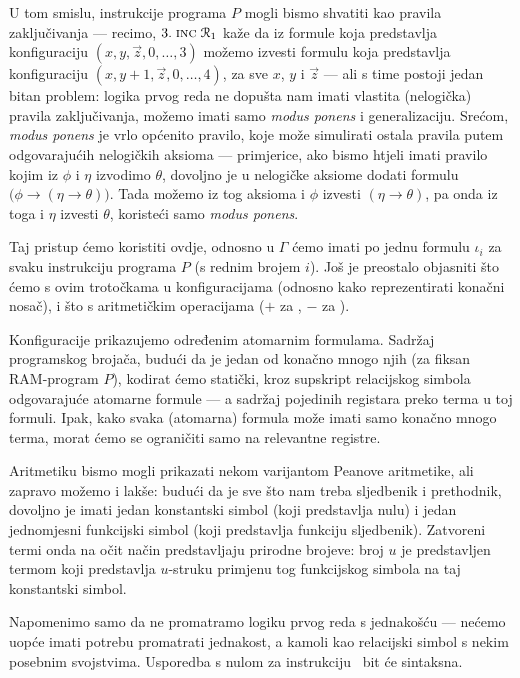 U tom smislu, instrukcije programa $P$ mogli bismo shvatiti kao pravila zaključivanja --- recimo, $3.\;\textsc{inc}\;\mathcal R_{1}$ kaže da iz formule koja predstavlja konfiguraciju $(x,y,\vec z,0,\dotsc,3)$ možemo izvesti formulu koja predstavlja konfiguraciju $(x,y+1,\vec z,0,\dotsc,4)$, za sve $x$, $y$ i $\vec z$ --- ali s time postoji jedan bitan problem: logika prvog reda ne dopušta nam imati vlastita (nelogička) pravila zaključivanja, možemo imati samo \emph{modus ponens} i generalizaciju. Srećom, \emph{modus ponens} je vrlo općenito pravilo, koje može simulirati ostala pravila putem odgovarajućih nelogičkih aksioma --- primjerice, ako bismo htjeli imati pravilo kojim iz $\phi$ i $\eta$ izvodimo $\theta$, dovoljno je u nelogičke aksiome dodati formulu $\bigl(\phi\to(\eta\to\theta)\bigr)$. Tada možemo iz tog aksioma i $\phi$ izvesti $(\eta\to\theta)$, pa onda iz toga i $\eta$ izvesti $\theta$, koristeći samo \emph{modus ponens}.

Taj pristup ćemo koristiti ovdje, odnosno u $\Gamma$ ćemo imati po jednu formulu $\iota_i$ za svaku instrukciju programa $P$ (s rednim brojem $i$). Još je preostalo objasniti što ćemo s ovim trotočkama u konfiguracijama (odnosno kako reprezentirati konačni nosač), i što s aritmetičkim operacijama ($+$ za \inc, $-$ za \dec).

Konfiguracije prikazujemo određenim atomarnim formulama. Sadržaj programskog brojača, budući da je jedan od konačno mnogo njih (za fiksan RAM-program $P$), kodirat ćemo statički, kroz supskript relacijskog simbola odgovarajuće atomarne formule --- a sadržaj pojedinih registara preko terma u toj formuli. Ipak, kako svaka (atomarna) formula može imati samo konačno mnogo terma, morat ćemo se ograničiti samo na relevantne registre.

Aritmetiku bismo mogli prikazati nekom 
varijantom Peanove aritmetike, ali zapravo možemo i lakše: budući da je sve što nam treba sljedbenik i prethodnik, dovoljno je imati jedan konstantski simbol (koji predstavlja nulu) i jedan jednomjesni funkcijski simbol (koji predstavlja funkciju sljedbenik). Zatvoreni termi onda na očit način predstavljaju prirodne brojeve: broj $u$ je predstavljen termom koji predstavlja $u$-struku primjenu tog funkcijskog simbola na taj konstantski simbol.

Napomenimo samo da ne promatramo logiku prvog reda s jednakošću --- nećemo uopće imati potrebu promatrati jednakost, a kamoli kao relacijski simbol s nekim posebnim svojstvima. Usporedba s nulom za instrukciju \dec\ bit će sintaksna.

